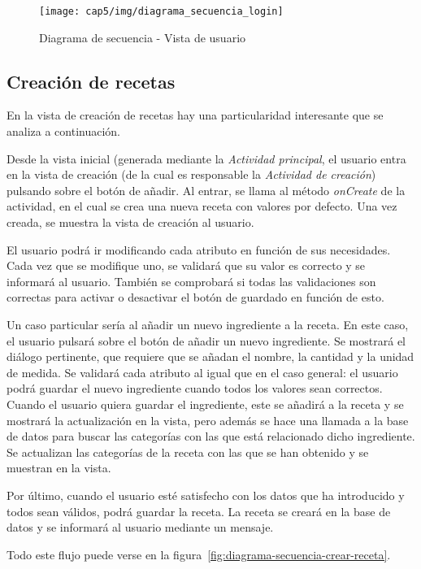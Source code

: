 \begin{figure}[htbp]
  \centering
  \texttt{[image: cap5/img/diagrama\_secuencia\_login]}
  \caption{Diagrama de secuencia - Vista de usuario}
  \label{fig:diagrama-secuencia-login}
\end{figure}


\subsection{Creación de recetas}

En la vista de creación de recetas hay una particularidad interesante que
se analiza a continuación.

Desde la vista inicial (generada mediante la \textit{Actividad principal}, el
usuario entra en la vista de creación (de la cual es responsable la
\textit{Actividad de creación}) pulsando sobre el botón de añadir. Al entrar, se
llama al método \textit{onCreate} de la actividad, en el cual se crea una nueva
receta con valores por defecto. Una vez creada, se muestra la vista de creación
al usuario.

El usuario podrá ir modificando cada atributo en función de sus necesidades.
Cada vez que se modifique uno, se validará que su valor es correcto y se
informará al usuario. También se comprobará si todas las validaciones son
correctas para activar o desactivar el botón de guardado en función de esto.

Un caso particular sería al añadir un nuevo ingrediente a la receta. En este
caso, el usuario pulsará sobre el botón de añadir un nuevo ingrediente. Se
mostrará el diálogo pertinente, que requiere que se añadan el nombre, la cantidad
y la unidad de medida. Se validará cada atributo al igual que en el caso general:
el usuario podrá guardar el nuevo ingrediente cuando todos los valores sean
correctos. Cuando el usuario quiera guardar el ingrediente, este se añadirá a
la receta y se mostrará la actualización en la vista, pero además se hace una
llamada a la base de datos para buscar las categorías con las que está relacionado
dicho ingrediente. Se actualizan las categorías de la receta con las que se han
obtenido y se muestran en la vista.

Por último, cuando el usuario esté satisfecho con los datos que ha introducido y
todos sean válidos, podrá guardar la receta. La receta se creará en la base
de datos y se informará al usuario mediante un mensaje.

Todo este flujo puede verse en la figura~\ref{fig:diagrama-secuencia-crear-receta}.

